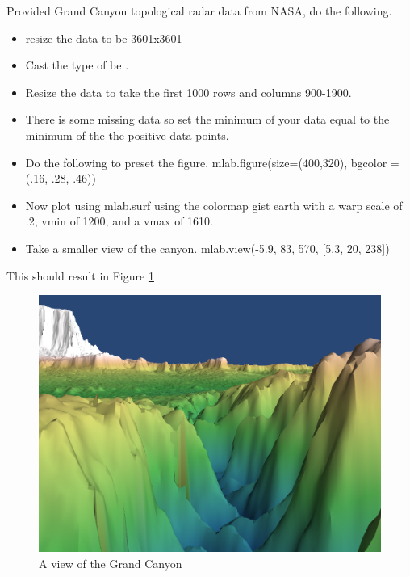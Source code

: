 \begin{problem} 
Provided Grand Canyon topological radar data from NASA, 
do the following.

\begin{itemize}
\item resize the data to be 3601x3601
\item Cast the type of be . 
\item Resize the data to take the first 1000 rows and columns 900-1900.
\item There is some missing data so set the minimum of your data equal to the minimum of the the positive data points. 
\item Do the following to preset the figure. mlab.figure(size=(400,320), bgcolor = (.16, .28, .46))
\item Now plot using mlab.surf using the colormap gist earth with a warp scale of .2, vmin of 1200, and a vmax of 1610.
\item Take a smaller view of the canyon. mlab.view(-5.9, 83, 570, [5.3, 20, 238])
\end{itemize}

This should result in Figure \ref{fig:GrandCanyon}
\end{problem}

\begin{figure} 
\includegraphics[width=\textwidth]{GrandCanyon.png}
\caption{A view of the Grand Canyon} 
\label{fig:GrandCanyon}
\end{figure}


